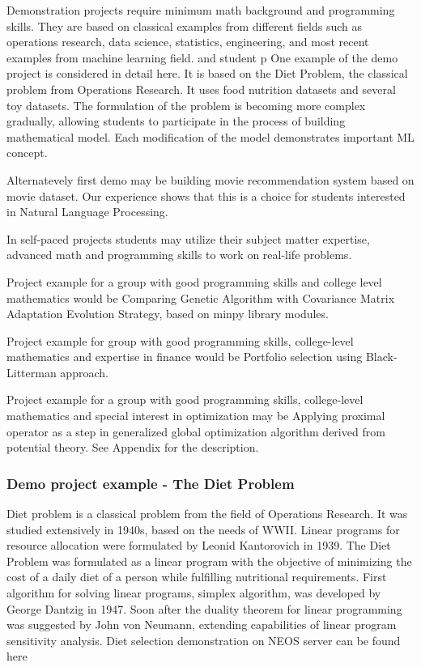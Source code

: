 \documentclass{article} %
\begin{document}
Demonstration projects require minimum math background and programming skills. They are based on classical examples from different fields such as operations research, data science, statistics, engineering, and most recent examples from machine learning field. and student p
One example of the demo project is considered in detail here. It is based on the Diet Problem, the classical problem from Operations Research. It uses food nutrition datasets  and several toy datasets. The formulation of the problem is becoming more complex gradually, allowing students to participate in the process of building mathematical model. Each modification of the model demonstrates important  ML concept.

Alternatevely first demo may be building movie recommendation system  based on movie dataset. Our experience shows that this is a choice for students interested in Natural Language Processing. 


In self-paced projects students may utilize their subject matter expertise, advanced math and programming skills to work on real-life problems. 

Project example for a group with good programming skills and  college level mathematics would be Comparing Genetic Algorithm with Covariance Matrix Adaptation Evolution Strategy, based on minpy library modules.

Project example for group with good programming skills, college-level mathematics and expertise in finance would be Portfolio selection using Black-Litterman approach. 

Project example for a group with good programming skills, college-level mathematics  and special interest in optimization may be Applying proximal operator as a step in generalized global optimization algorithm derived from potential theory. See Appendix for the description.


\subsubsection{Demo project  example - The Diet Problem}
Diet problem is a classical problem from the field of Operations Research.  It was studied extensively in 1940s, based on the needs of WWII. Linear programs for resource allocation were formulated by Leonid Kantorovich in 1939. The Diet Problem was formulated as a linear program with the objective of minimizing the cost of a daily diet of a person while fulfilling nutritional requirements. First algorithm for solving linear programs, simplex algorithm, was developed by George Dantzig in 1947. Soon after the duality theorem for linear programming was suggested by John von Neumann, extending capabilities of linear program sensitivity analysis. 
Diet selection demonstration on NEOS server can be found here \cite{neos}
\end{document}
